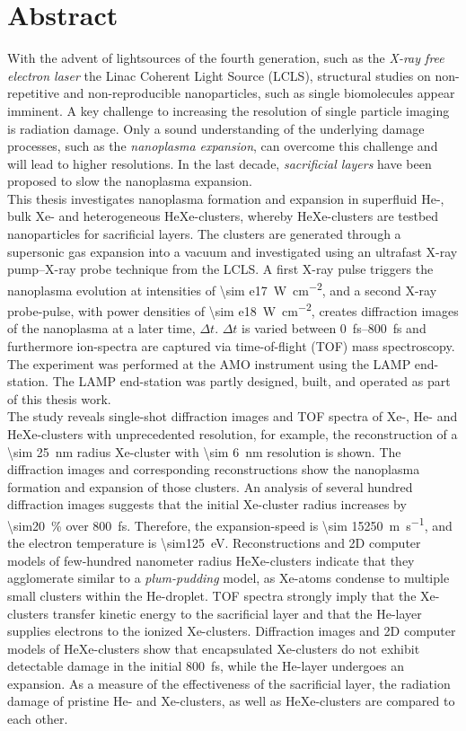 \section*{Abstract}\label{ch:abstract}
With the advent of lightsources of the fourth generation, such as the \textit{X-ray free electron laser} the Linac Coherent Light Source (LCLS), structural studies on non-repetitive and non-reproducible nanoparticles, such as single biomolecules appear imminent. A key challenge to increasing the resolution of single particle imaging is radiation damage. Only a sound understanding of the underlying damage processes, such as the \textit{nanoplasma expansion}, can overcome this challenge and will lead to higher resolutions. In the last decade, \textit{sacrificial layers} have been proposed to slow the nanoplasma expansion.\\[0.4\baselineskip]
%
This thesis investigates nanoplasma formation and expansion in superfluid He-, bulk Xe- and heterogeneous HeXe-clusters, whereby HeXe-clusters are testbed nanoparticles for sacrificial layers. The clusters are generated through a supersonic gas expansion into a vacuum and investigated using an ultrafast X-ray pump--X-ray probe technique from the LCLS. A first X-ray pulse triggers the nanoplasma evolution at intensities of \SI{\sim e17}{\watt\per\square\centi\meter}, and a second X-ray probe-pulse, with power densities of \SI{\sim e18}{\watt\per\square\centi\meter}, creates diffraction images of the nanoplasma at a later time, $\Delta t$. $\Delta t$ is varied between \SIrange{0}{800}{\femto\second} and furthermore ion-spectra are captured via time-of-flight (TOF) mass spectroscopy. The experiment was performed at the AMO instrument using the LAMP end-station. The LAMP end-station was partly designed, built, and operated as part of this thesis work.\\[0.4\baselineskip]
%
The study reveals single-shot diffraction images and TOF spectra of Xe-, He- and HeXe-clusters with unprecedented resolution, for example, the reconstruction of a \SI{\sim 25}{\nano\meter} radius Xe-cluster with \SI{\sim 6}{\nano\meter} resolution is shown. The diffraction images and corresponding reconstructions show the nanoplasma formation and expansion of those clusters. An analysis of several hundred diffraction images suggests that the initial Xe-cluster radius increases by \SI{\sim20}{\percent} over \SI{800}{\femto\second}. Therefore, the expansion-speed is \SI{\sim 15250}{\meter\per\second}, and the electron temperature is \SI{\sim125}{\electronvolt}. Reconstructions and 2D computer models of few-hundred nanometer radius HeXe-clusters indicate that they agglomerate similar to a \textit{plum-pudding} model, as Xe-atoms condense to multiple small clusters within the He-droplet. TOF spectra strongly imply that the Xe-clusters transfer kinetic energy to the sacrificial layer and that the He-layer supplies electrons to the ionized Xe-clusters. Diffraction images and 2D computer models of HeXe-clusters show that encapsulated Xe-clusters do not exhibit detectable damage in the initial \SI{800}{\femto\second}, while the He-layer undergoes an expansion. As a measure of the effectiveness of the sacrificial layer, the radiation damage of pristine He- and Xe-clusters, as well as HeXe-clusters are compared to each other.
%
%
%
%